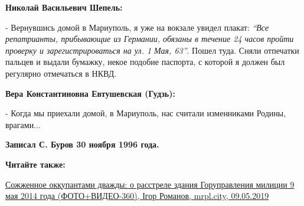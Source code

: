 \textbf{Николай Васильевич Шепель:}

- Вернувшись домой в Мариуполь, я уже на вокзале увидел плакат: \emph{\enquote{Все
репатрианты, прибывающие из Германии, обязаны в течение 24 часов пройти
проверку и зарегистрироваться на ул. 1 Мая, 63}}. Пошел туда. Сняли отпечатки
пальцев и выдали бумажку, некое подобие паспорта, с которой я должен был
регулярно отмечаться в НКВД.

\textbf{Вера Константиновна Евтушевская (Гудзь):}

- Когда мы приехали домой, в Мариуполь, нас считали изменниками Родины, врагами...

\vspace{0.5cm}
\begin{flushright}
\textbf{Записал С. Буров 30 ноября 1996 года.}
	
\end{flushright}
\vspace{0.5cm}

\clearpage
\textbf{Читайте также:}

\href{https://mrpl.city/news/view/sozhzhennoe-okkupantami-dvazhdy-o-rasstrele-zdaniya-gorupravleniya-militsii-9-maya-2014-goda-foto-plusvideo-360}{Сожженное оккупантами дважды: о расстреле здания Горуправления милиции 9 мая 2014 года (ФОТО+ВИДЕО-360), Ігор Романов, mrpl.city, 09.05.2019}
